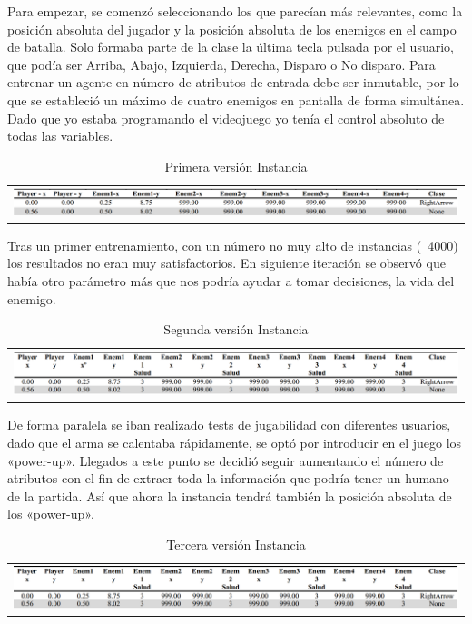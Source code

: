 Para empezar, se comenzó seleccionando los que parecían más relevantes, como la posición absoluta del jugador y la posición absoluta de los enemigos  en el campo de batalla. Solo formaba parte de la clase la última tecla pulsada por el usuario, que podía ser Arriba, Abajo, Izquierda, Derecha, Disparo o No disparo. Para entrenar un agente en número de atributos de entrada debe ser inmutable, por lo que se estableció un máximo de cuatro enemigos en pantalla de forma simultánea. Dado que yo estaba programando el videojuego yo tenía el control absoluto de todas las variables.


\begin{table}[]
    \centering
    \begin{tabular}{c}
\includegraphics[width=\textwidth]{../img/tabla1-estados1}
    \end{tabular}
    \caption{Primera versión Instancia}
    \label{tab:Primera_versión}
\end{table}

Tras un primer entrenamiento, con un número no muy alto de instancias (~4000) los resultados no eran muy satisfactorios. En siguiente iteración se observó que había otro parámetro más que nos podría ayudar a tomar decisiones, la vida del enemigo.



\begin{table}[]
    \centering
    \begin{tabular}{c}
\includegraphics[width=\textwidth]{../img/tabla2-estados2}
    \end{tabular}
    \caption{Segunda versión Instancia}
    \label{tab:Segunda_versión}
\end{table}


De forma paralela se iban realizado tests de jugabilidad con diferentes usuarios, dado que el arma se calentaba rápidamente, se optó por introducir en el juego los «power-up». Llegados a este punto se decidió seguir aumentando el número de atributos con el fin de extraer toda la información que podría tener un humano de la partida. Así que ahora la instancia tendrá también la posición absoluta de los «power-up». 

\begin{table}[]
    \centering
    \begin{tabular}{c}
\includegraphics[width=\textwidth]{../img/tabla3-estados3}
    \end{tabular}
    \caption{Tercera versión Instancia}
    \label{tab:Tercera_versión}
\end{table}
    


